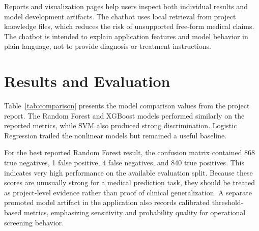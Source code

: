 \documentclass[conference]{IEEEtran}
\begin{document}
Reports and visualization pages help users inspect both individual results and model development artifacts. The chatbot uses local retrieval from project knowledge files, which reduces the risk of unsupported free-form medical claims. The chatbot is intended to explain application features and model behavior in plain language, not to provide diagnosis or treatment instructions.

\section{Results and Evaluation}
Table~\ref{tab:comparison} presents the model comparison values from the project report. The Random Forest and XGBoost models performed similarly on the reported metrics, while SVM also produced strong discrimination. Logistic Regression trailed the nonlinear models but remained a useful baseline.

\begin{table}[!t]
\caption{Model Comparison from the HeartCareAI Project Report}
\label{tab:comparison}
\centering
\scriptsize
{}
\end{table}

For the best reported Random Forest result, the confusion matrix contained 868 true negatives, 1 false positive, 4 false negatives, and 840 true positives. This indicates very high performance on the available evaluation split. Because these scores are unusually strong for a medical prediction task, they should be treated as project-level evidence rather than proof of clinical generalization. A separate promoted model artifact in the application also records calibrated threshold-based metrics, emphasizing sensitivity and probability quality for operational screening behavior.
\end{document}
